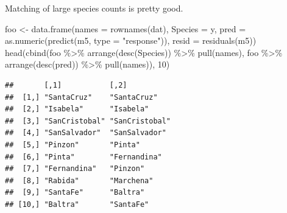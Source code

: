 \documentclass[
  ignorenonframetext,
]{beamer}
\newenvironment{Shaded}{\begin{snugshade}}{\end{snugshade}}
\newcommand{\AttributeTok}[1]{\textcolor[rgb]{0.77,0.63,0.00}{#1}}
\newcommand{\DecValTok}[1]{\textcolor[rgb]{0.00,0.00,0.81}{#1}}
\newcommand{\FunctionTok}[1]{\textcolor[rgb]{0.00,0.00,0.00}{#1}}
\newcommand{\NormalTok}[1]{#1}
\newcommand{\OtherTok}[1]{\textcolor[rgb]{0.56,0.35,0.01}{#1}}
\newcommand{\SpecialCharTok}[1]{\textcolor[rgb]{0.00,0.00,0.00}{#1}}
\newcommand{\StringTok}[1]{\textcolor[rgb]{0.31,0.60,0.02}{#1}}
\begin{document}
\begin{frame}[fragile]{}
\protect\hypertarget{section-24}{}
Matching of large species counts is pretty good.

\vspace{12pt}
\tiny

\begin{Shaded}
\begin{Highlighting}[]
\NormalTok{foo }\OtherTok{\textless{}{-}} \FunctionTok{data.frame}\NormalTok{(}\AttributeTok{names =} \FunctionTok{rownames}\NormalTok{(dat),}
                  \AttributeTok{Species =}\NormalTok{ y,}
                  \AttributeTok{pred =} \FunctionTok{as.numeric}\NormalTok{(}\FunctionTok{predict}\NormalTok{(m5, }\AttributeTok{type =} \StringTok{"response"}\NormalTok{)), }
                  \AttributeTok{resid =} \FunctionTok{residuals}\NormalTok{(m5))}
\FunctionTok{head}\NormalTok{(}\FunctionTok{cbind}\NormalTok{(foo }\SpecialCharTok{\%\textgreater{}\%} \FunctionTok{arrange}\NormalTok{(}\FunctionTok{desc}\NormalTok{(Species)) }\SpecialCharTok{\%\textgreater{}\%} \FunctionTok{pull}\NormalTok{(names),}
\NormalTok{           foo }\SpecialCharTok{\%\textgreater{}\%} \FunctionTok{arrange}\NormalTok{(}\FunctionTok{desc}\NormalTok{(pred)) }\SpecialCharTok{\%\textgreater{}\%} \FunctionTok{pull}\NormalTok{(names)), }\DecValTok{10}\NormalTok{)}
\end{Highlighting}
\end{Shaded}

\begin{verbatim}
##       [,1]           [,2]          
##  [1,] "SantaCruz"    "SantaCruz"   
##  [2,] "Isabela"      "Isabela"     
##  [3,] "SanCristobal" "SanCristobal"
##  [4,] "SanSalvador"  "SanSalvador" 
##  [5,] "Pinzon"       "Pinta"       
##  [6,] "Pinta"        "Fernandina"  
##  [7,] "Fernandina"   "Pinzon"      
##  [8,] "Rabida"       "Marchena"    
##  [9,] "SantaFe"      "Baltra"      
## [10,] "Baltra"       "SantaFe"
\end{verbatim}
\end{frame}
\end{document}

